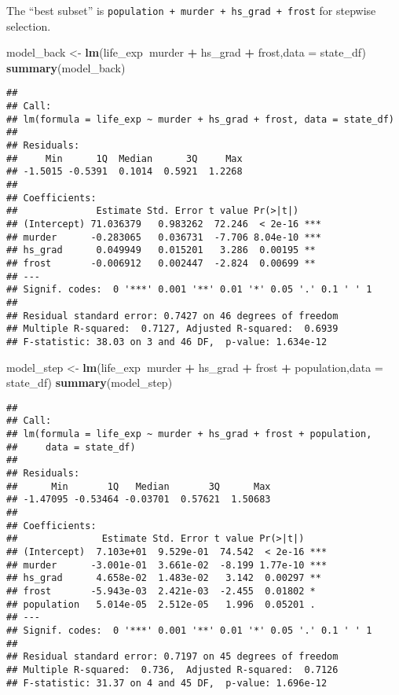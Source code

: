 \documentclass[]{article}
\newenvironment{Shaded}{\begin{snugshade}}{\end{snugshade}}
\newcommand{\DataTypeTok}[1]{\textcolor[rgb]{0.13,0.29,0.53}{#1}}
\newcommand{\KeywordTok}[1]{\textcolor[rgb]{0.13,0.29,0.53}{\textbf{#1}}}
\newcommand{\NormalTok}[1]{#1}
\newcommand{\OperatorTok}[1]{\textcolor[rgb]{0.81,0.36,0.00}{\textbf{#1}}}
\newcommand{\StringTok}[1]{\textcolor[rgb]{0.31,0.60,0.02}{#1}}
\begin{document}
The ``best subset'' is
\texttt{population\ +\ murder\ +\ hs\_grad\ +\ frost} for stepwise
selection.

\begin{Shaded}
\begin{Highlighting}[]
\NormalTok{model_back <-}\StringTok{  }\KeywordTok{lm}\NormalTok{(life_exp}\OperatorTok{~}\NormalTok{murder }\OperatorTok{+}\StringTok{ }\NormalTok{hs_grad }\OperatorTok{+}\StringTok{ }\NormalTok{frost,}\DataTypeTok{data =}\NormalTok{ state_df)}
\KeywordTok{summary}\NormalTok{(model_back)}
\end{Highlighting}
\end{Shaded}

\begin{verbatim}
## 
## Call:
## lm(formula = life_exp ~ murder + hs_grad + frost, data = state_df)
## 
## Residuals:
##     Min      1Q  Median      3Q     Max 
## -1.5015 -0.5391  0.1014  0.5921  1.2268 
## 
## Coefficients:
##              Estimate Std. Error t value Pr(>|t|)    
## (Intercept) 71.036379   0.983262  72.246  < 2e-16 ***
## murder      -0.283065   0.036731  -7.706 8.04e-10 ***
## hs_grad      0.049949   0.015201   3.286  0.00195 ** 
## frost       -0.006912   0.002447  -2.824  0.00699 ** 
## ---
## Signif. codes:  0 '***' 0.001 '**' 0.01 '*' 0.05 '.' 0.1 ' ' 1
## 
## Residual standard error: 0.7427 on 46 degrees of freedom
## Multiple R-squared:  0.7127, Adjusted R-squared:  0.6939 
## F-statistic: 38.03 on 3 and 46 DF,  p-value: 1.634e-12
\end{verbatim}

\begin{Shaded}
\begin{Highlighting}[]
\NormalTok{model_step <-}\StringTok{  }\KeywordTok{lm}\NormalTok{(life_exp}\OperatorTok{~}\NormalTok{murder }\OperatorTok{+}\StringTok{ }\NormalTok{hs_grad }\OperatorTok{+}\StringTok{ }\NormalTok{frost }\OperatorTok{+}\StringTok{ }\NormalTok{population,}\DataTypeTok{data =}\NormalTok{ state_df)}
\KeywordTok{summary}\NormalTok{(model_step)}
\end{Highlighting}
\end{Shaded}

\begin{verbatim}
## 
## Call:
## lm(formula = life_exp ~ murder + hs_grad + frost + population, 
##     data = state_df)
## 
## Residuals:
##      Min       1Q   Median       3Q      Max 
## -1.47095 -0.53464 -0.03701  0.57621  1.50683 
## 
## Coefficients:
##               Estimate Std. Error t value Pr(>|t|)    
## (Intercept)  7.103e+01  9.529e-01  74.542  < 2e-16 ***
## murder      -3.001e-01  3.661e-02  -8.199 1.77e-10 ***
## hs_grad      4.658e-02  1.483e-02   3.142  0.00297 ** 
## frost       -5.943e-03  2.421e-03  -2.455  0.01802 *  
## population   5.014e-05  2.512e-05   1.996  0.05201 .  
## ---
## Signif. codes:  0 '***' 0.001 '**' 0.01 '*' 0.05 '.' 0.1 ' ' 1
## 
## Residual standard error: 0.7197 on 45 degrees of freedom
## Multiple R-squared:  0.736,  Adjusted R-squared:  0.7126 
## F-statistic: 31.37 on 4 and 45 DF,  p-value: 1.696e-12
\end{verbatim}
\end{document}
